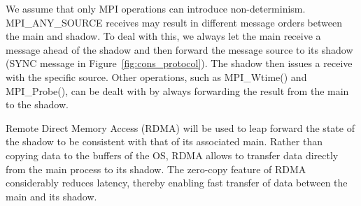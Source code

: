 We assume that only MPI operations can introduce non-determinism. MPI\_ANY\_SOURCE receives may result in different message orders between the main and shadow. To deal with this, we always let the main receive a message ahead of the shadow and then forward the message source to its shadow (SYNC message in Figure~\ref{fig:cons_protocol}). 
The shadow then issues a receive with the specific source. Other operations, such as MPI\_Wtime() and MPI\_Probe(), can be dealt with by always forwarding the result from the main to the shadow.

Remote Direct Memory Access (RDMA) will be used to leap forward the state of the shadow to be consistent with that of its associated main. Rather than copying data to the buffers of the OS, RDMA allows to transfer data directly from the main process to its shadow. The zero-copy feature of RDMA considerably reduces latency, thereby enabling fast transfer of data between the main and its shadow.
